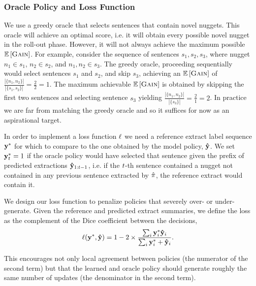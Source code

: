 \subsubsection{Oracle Policy and Loss Function}

We use a greedy oracle that selects sentences that contain novel
nuggets. This oracle will achieve an optimal \comp{} score, i.e.
it will obtain every possible novel nugget in the roll-out phase.
However, it will not always achieve the maximum possible $\mathbb{E}\left[\textsc{Gain}\right]$.
For example, consider the sequence of sentences $s_1, s_2, s_3$, where
nugget $n_1 \in s_1$, $n_2 \in s_2$, and $n_1,n_2 \in s_3$. The greedy oracle,
proceeding sequentially would select sentences $s_1$ and $s_2$, and skip
$s_3$, achieving an $\mathbb{E}\left[\textsc{Gain}\right]$ of $\frac{|\{n_1, n_2\}|}{|\{s_1, s_2 \}|}
= \frac{2}{2} = 1$. The maximum achievable $\mathbb{E}\left[\textsc{Gain}\right]$ is obtained by 
skipping
the first two sentences and selecting sentence $s_3$ yielding $\frac{|\{n_1, n_2\}|}{|\{s_3 \}|} = \frac{2}{1} = 2$. In practice we are far from matching
the greedy oracle and so it suffices for now as an aspirational target.

In order to implement a loss function $\ell$ we need a reference
extract label sequence $\mathbf{y}^*$ for which to compare to the one 
obtained by the model policy, $\mathbf{\hat{y}}$. We set 
$\mathbf{y}^*_t = 1$ if the oracle policy would have selected that
sentence given the prefix of predicted extractions $\mathbf{\hat{y}}_{1:t -1}$, i.e. if the $t$-th sentence contained a nugget not contained in
any previous sentence extracted by $\hat{\pi}$, the reference extract would
contain it.

We design our loss function to penalize policies that severely over- or
 under-generate. 
 Given the reference and predicted extract summaries, 
 we define the loss as the complement of
 the Dice coefficient between the decisions,
\begin{align*}
  \ell(\mathbf{y}^*, \mathbf{\hat{y}}) = 1 - 2 \times 
    \frac{ \sum_i \mathbf{y}^*_i \mathbf{\hat{y}}_i }{ 
    \sum_i \mathbf{y}^*_i + \mathbf{\hat{y}}_i }.
\end{align*}

 This encourages not only local agreement between policies (the numerator of
 the second term) but that the learned and oracle policy should generate
 roughly the same number of updates (the denominator in the second term).

